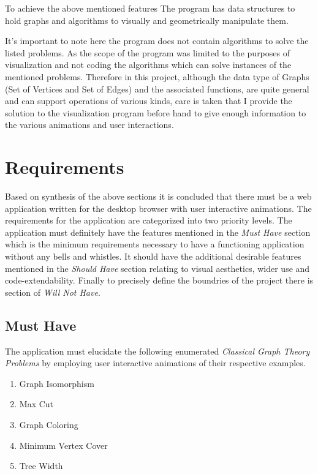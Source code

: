To achieve the above mentioned features The program has data structures to hold
graphs and algorithms to visually and geometrically manipulate them. 

It's important to note here the program does not contain algorithms to solve
the listed problems. As the scope of the program was limited to the purposes of
visualization and not coding the algorithms which can solve instances of the
mentioned problems.  Therefore in this project, although the data type of
Graphs (Set of Vertices and Set of Edges) and the associated functions, are
quite general and can support operations of various kinds, care is taken that I
provide the solution to the visualization program before hand to give enough
information to the various animations and user interactions.


\section{Requirements}
\label{requirements: requirements}
Based on synthesis of the above sections it is concluded that there must be a
web application written for the desktop browser with user interactive
animations. The requirements for the application are categorized into two
priority levels. The application must definitely have the features mentioned
in the \emph{Must Have} section which is the minimum requirements necessary
to have a functioning application without any bells and whistles. It should
have the additional desirable features mentioned in the \emph{Should Have}
section relating to visual aesthetics, wider use and code-extendability.
Finally to precisely define the boundries of the project there is section
of \emph{Will Not Have}.

\subsection{Must Have}
\label{requirements: musthave}
The application must elucidate the following enumerated \emph{Classical Graph Theory
Problems} by employing user interactive animations of their respective examples.
\begin{enumerate}
\item Graph Isomorphism
\item Max Cut
\item Graph Coloring
\item Minimum Vertex Cover
\item Tree Width
\end{enumerate}

